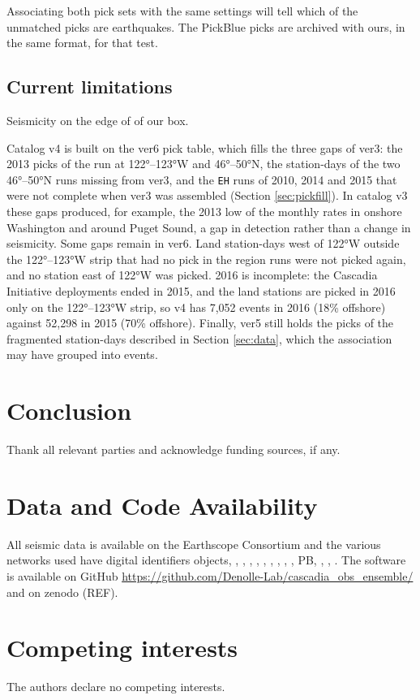 \documentclass[review]{seismica}
\begin{document}
Associating both pick sets with the same settings will tell which of the
unmatched picks are earthquakes. The PickBlue picks are archived with
ours, in the same format, for that test.

\subsection{Current limitations}\label{current-limitations}

Seismicity on the edge of of our box.

Catalog v4 is built on the ver6 pick table, which fills the three gaps
of ver3: the 2013 picks of the run at 122°--123°W and 46°--50°N, the
station-days of the two 46°--50°N runs missing from ver3, and the
\texttt{EH} runs of 2010, 2014 and 2015 that were not complete when ver3
was assembled (Section \ref{sec:pickfill}). In catalog v3 these gaps
produced, for example, the 2013 low of the monthly rates in onshore
Washington and around Puget Sound, a gap in detection rather than a
change in seismicity. Some gaps remain in ver6. Land station-days west
of 122°W outside the 122°--123°W strip that had no pick in the region
runs were not picked again, and no station east of 122°W was picked.
2016 is incomplete: the Cascadia Initiative deployments ended in 2015,
and the land stations are picked in 2016 only on the 122°--123°W strip,
so v4 has 7,052 events in 2016 (18\% offshore) against 52,298 in 2015
(70\% offshore). Finally, ver5 still holds the picks of the fragmented
station-days described in Section \ref{sec:data}, which the association
may have grouped into events.

\section{Conclusion}\label{conclusion}

Thank all relevant parties and acknowledge funding sources, if any.

\section*{Data and Code Availability}\label{data-and-code-availability}

All seismic data is available on the Earthscope Consortium and the
various networks used have digital identifiers objects,
\citep[C8][]{C8}, \citep[7D, 7A][]{7D}, \citep[CN][]{CN},
\citep[UW][]{UW}, \citep[UO][]{UO}, \citep[NC][]{NC}, \citep[BK][]{BK},
\citep[TA][]{TA}, \citep[OO][]{OO}, PB, \citep[X6][]{X6},
\citep[Z5][]{Z5}, \citep[X9][]{X9}. The software is available on GitHub
\url{https://github.com/Denolle-Lab/cascadia_obs_ensemble/} and on
zenodo (REF).

\section*{Competing interests}\label{competing-interests}

The authors declare no competing interests.



\end{document}

